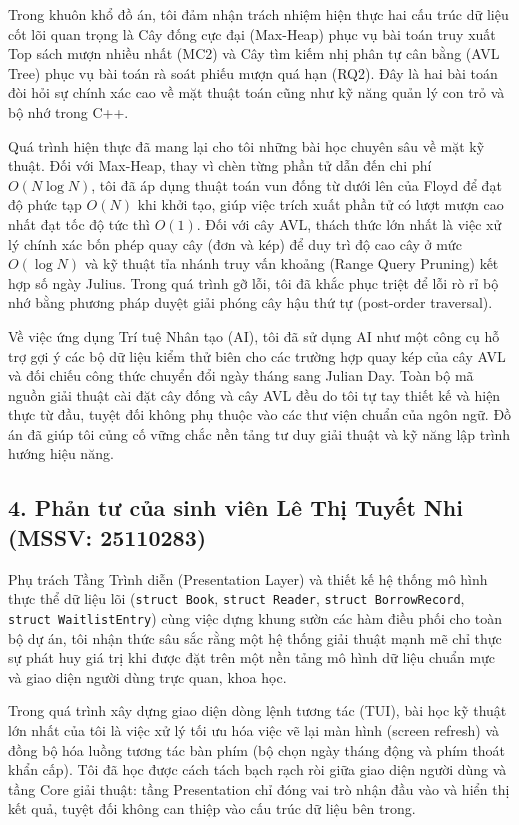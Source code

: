 \documentclass[14pt,a4paper]{extarticle}
\begin{document}
Trong khuôn khổ đồ án, tôi đảm nhận trách nhiệm hiện thực hai cấu trúc dữ liệu cốt lõi quan trọng là Cây đống cực đại (Max-Heap) phục vụ bài toán truy xuất Top sách mượn nhiều nhất (MC2) và Cây tìm kiếm nhị phân tự cân bằng (AVL Tree) phục vụ bài toán rà soát phiếu mượn quá hạn (RQ2). Đây là hai bài toán đòi hỏi sự chính xác cao về mặt thuật toán cũng như kỹ năng quản lý con trỏ và bộ nhớ trong C++.

Quá trình hiện thực đã mang lại cho tôi những bài học chuyên sâu về mặt kỹ thuật. Đối với Max-Heap, thay vì chèn từng phần tử dẫn đến chi phí $O(N \log N)$, tôi đã áp dụng thuật toán vun đống từ dưới lên của Floyd để đạt độ phức tạp $O(N)$ khi khởi tạo, giúp việc trích xuất phần tử có lượt mượn cao nhất đạt tốc độ tức thì $O(1)$. Đối với cây AVL, thách thức lớn nhất là việc xử lý chính xác bốn phép quay cây (đơn và kép) để duy trì độ cao cây ở mức $O(\log N)$ và kỹ thuật tỉa nhánh truy vấn khoảng (Range Query Pruning) kết hợp số ngày Julius. Trong quá trình gỡ lỗi, tôi đã khắc phục triệt để lỗi rò rỉ bộ nhớ bằng phương pháp duyệt giải phóng cây hậu thứ tự (post-order traversal).

Về việc ứng dụng Trí tuệ Nhân tạo (AI), tôi đã sử dụng AI như một công cụ hỗ trợ gợi ý các bộ dữ liệu kiểm thử biên cho các trường hợp quay kép của cây AVL và đối chiếu công thức chuyển đổi ngày tháng sang Julian Day. Toàn bộ mã nguồn giải thuật cài đặt cây đống và cây AVL đều do tôi tự tay thiết kế và hiện thực từ đầu, tuyệt đối không phụ thuộc vào các thư viện chuẩn của ngôn ngữ. Đồ án đã giúp tôi củng cố vững chắc nền tảng tư duy giải thuật và kỹ năng lập trình hướng hiệu năng.

\subsection*{4. Phản tư của sinh viên Lê Thị Tuyết Nhi (MSSV: 25110283)}

Phụ trách Tầng Trình diễn (Presentation Layer) và thiết kế hệ thống mô hình thực thể dữ liệu lõi (\texttt{struct Book}, \texttt{struct Reader}, \texttt{struct BorrowRecord}, \texttt{struct WaitlistEntry}) cùng việc dựng khung sườn các hàm điều phối cho toàn bộ dự án, tôi nhận thức sâu sắc rằng một hệ thống giải thuật mạnh mẽ chỉ thực sự phát huy giá trị khi được đặt trên một nền tảng mô hình dữ liệu chuẩn mực và giao diện người dùng trực quan, khoa học.

Trong quá trình xây dựng giao diện dòng lệnh tương tác (TUI), bài học kỹ thuật lớn nhất của tôi là việc xử lý tối ưu hóa việc vẽ lại màn hình (screen refresh) và đồng bộ hóa luồng tương tác bàn phím (bộ chọn ngày tháng động và phím thoát khẩn cấp). Tôi đã học được cách tách bạch rạch ròi giữa giao diện người dùng và tầng Core giải thuật: tầng Presentation chỉ đóng vai trò nhận đầu vào và hiển thị kết quả, tuyệt đối không can thiệp vào cấu trúc dữ liệu bên trong.
\end{document}
